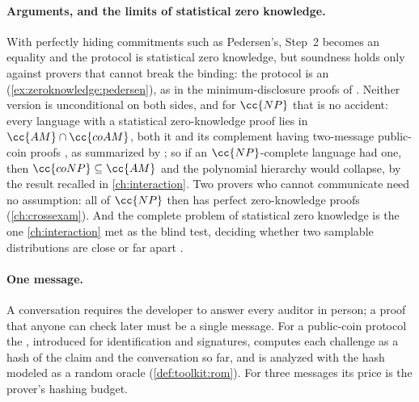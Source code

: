 \begin{refsection}
\paragraph{Arguments, and the limits of statistical zero knowledge.} With perfectly hiding commitments such as Pedersen's, Step~2 becomes an equality and the protocol is statistical zero knowledge, but soundness holds only against provers that cannot break the binding: the protocol is an  (\cref{ex:zeroknowledge:pedersen}), as in the minimum-disclosure proofs of \textcite{BrassardChaumCrepeau1988}. Neither version is unconditional on both sides, and for $\cc{NP}$ that is no accident: every language with a statistical zero-knowledge proof lies in $\cc{AM}\cap\cc{coAM}$, both it and its complement having two-message public-coin proofs \parencite{Fortnow1987,AielloHastad1991}, as summarized by \textcite[Section~11.2]{Thaler2022}; so if an $\cc{NP}$-complete language had one, then $\cc{coNP}\subseteq\cc{AM}$ and the polynomial hierarchy would collapse, by the result recalled in \cref{ch:interaction}. Two provers who cannot communicate need no assumption: all of $\cc{NP}$ then has perfect zero-knowledge proofs \parencite{BenOrEtAl1988} (\cref{ch:crossexam}). And the complete problem of statistical zero knowledge is the one \cref{ch:interaction} met as the blind test, deciding whether two samplable distributions are close or far apart \parencite{SahaiVadhan2003}.

\paragraph{One message.} A conversation requires the developer to answer every auditor in person; a proof that anyone can check later must be a single message. For a public-coin protocol the  \parencite{FiatShamir1986}, introduced for identification and signatures, computes each challenge as a hash of the claim and the conversation so far, and is analyzed with the hash modeled as a random oracle (\cref{def:toolkit:rom}). For three messages its price is the prover's hashing budget.


\end{refsection}
